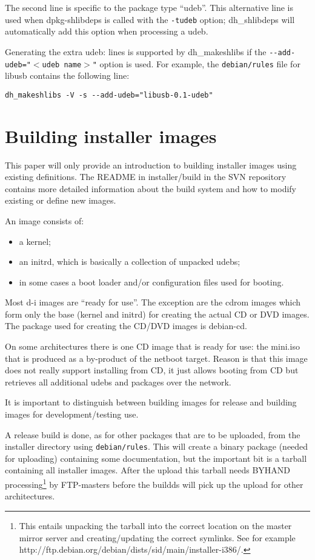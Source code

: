 \documentclass[a4paper,10pt]{article}
\begin{document}
The second line is specific to the package type “udeb”. This alternative line is used when dpkg-shlibdeps is called with the \texttt{-tudeb} option; dh\_shlibdeps will automatically add this option when processing a udeb. 

Generating the extra udeb: lines is supported by dh\_makeshlibs if the \texttt{{-}{-}add-udeb="$<$udeb name$>$"} option is used. For example, the \texttt{debian/rules} file for libusb contains the following line: 

\begin{verbatim}
dh_makeshlibs -V -s --add-udeb="libusb-0.1-udeb"
\end{verbatim}


\section{Building installer images}

This paper will only provide an introduction to building installer images using existing definitions. The README in installer/build in the SVN repository contains more detailed information about the build system and how to modify existing or define new images. 

An image consists of: 

\begin{itemize}
\item a kernel; 
\item an initrd, which is basically a collection of unpacked udebs; 
\item in some cases a boot loader and/or configuration files used for booting.
\end{itemize}

Most d-i images are “ready for use”. The exception are the cdrom images which form only the base (kernel and initrd) for creating the actual CD or DVD images. The package used for creating the CD/DVD images is debian-cd. 

On some architectures there is one CD image that is ready for use: the mini.iso that is produced as a by-product of the netboot target. Reason is that this image does not really support installing from CD, it just allows booting from CD but retrieves all additional udebs and packages over the network. 

It is important to distinguish between building images for release and building images for development/testing use. 

A release build is done, as for other packages that are to be uploaded, from the installer directory using \texttt{debian/rules}. This will create a binary package (needed for uploading) containing some documentation, but the important bit is a tarball containing all installer images. After the upload this tarball needs BYHAND processing\footnote{This entails unpacking the tarball into the correct location on the master mirror server and creating/updating the correct symlinks. See for example http://ftp.debian.org/debian/dists/sid/main/installer-i386/.} by FTP-masters before the buildds will pick up the upload for other architectures. 
\end{document}
